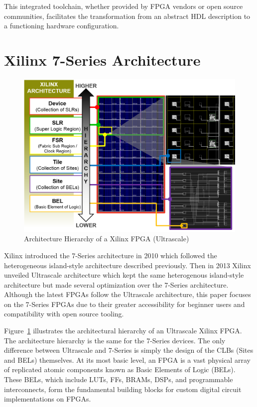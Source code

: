 \documentclass[twocolumn]{article}
\begin{document}
    This integrated toolchain, whether provided by FPGA vendors or open source communities, facilitates the transformation from an abstract HDL description to a functioning hardware configuration.

\section{Xilinx 7-Series Architecture}

    \begin{figure}
        \centering
        \includegraphics[width=\textwidth]{figures/hierarchy.png}
        \caption{Architecture Hierarchy of a Xilinx FPGA (Ultrascale)}
        \label{fig:hierarchy}
    \end{figure}

    Xilinx introduced the 7-Series architecture in 2010 which followed the heterogeneous island-style architecture described previously. 
    Then in 2013 Xilinx unveiled Ultrascale architecture which kept the same heterogenous island-style architecture but made several optimization over the 7-Series architecture.
    Although the latest FPGAs follow the Ultrascale architecture, this paper focuses on the 7-Series FPGAs due to their greater accessibility for beginner users and compatibility with open source tooling.

    Figure~\ref{fig:hierarchy} illustrates the architectural hierarchy of an Ultrascale Xilinx FPGA. 
    The architecture hierarchy is the same for the 7-Series devices. 
    The only difference between Ultrascale and 7-Series is simply the design of the CLBs (Sites and BELs) themselves. 
    At its most basic level, an FPGA is a vast physical array of replicated atomic components known as Basic Elements of Logic (BELs). 
    These BELs, which include LUTs, FFs, BRAMs, DSPs, and programmable interconnects, form the fundamental building blocks for custom digital circuit implementations on FPGAs. 
\end{document}
